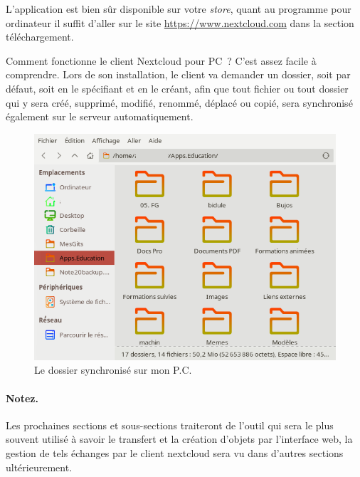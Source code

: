 L'application est bien sûr disponible sur votre \emph{store\/}, quant au programme pour ordinateur il suffit d'aller sur le site \url{https://www.nextcloud.com} dans la section téléchargement.

Comment fonctionne le client Nextcloud pour PC~? 
C'est assez facile à comprendre. 
Lors de son installation, le client va demander un dossier, soit par défaut, soit en le spécifiant et en le créant, afin que tout fichier ou tout dossier qui y sera créé, supprimé, modifié, renommé, déplacé ou copié, sera synchronisé également sur le serveur automatiquement.
\begin{figure} \label{fig-dossier-synchro}
	\centering
	\includegraphics{./Captures/nextcloud-client.dossier.synchronise.png}
	\caption{Le dossier synchronisé sur mon P.C.}
\end{figure}

\paragraph{Notez.} 
Les prochaines sections et sous-sections traiteront de l'outil qui sera le plus souvent utilisé à savoir le transfert et la création d'objets par l'interface web, la gestion de tels échanges par le client nextcloud sera vu dans d'autres sections ultérieurement.